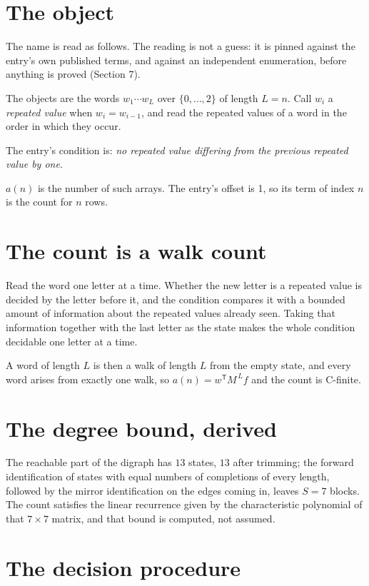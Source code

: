 \documentclass[11pt]{article}
\theoremstyle{definition}
\begin{document}
\section{The object}

The name is read as follows. The reading is not a guess: it is pinned against the entry's own published terms, and against an independent enumeration, before anything is proved (Section 7).

The objects are the words $w_1\cdots w_L$ over $\{0,\dots,2\}$ of length $L = n$. Call $w_i$ a {\itshape repeated value} when $w_i = w_{i-1}$, and read the repeated values of a word in the order in which they occur.

The entry's condition is: {\itshape no repeated value differing from the previous repeated value by one}.

$a(n)$ is the number of such arrays. The entry's offset is 1, so its term of index $n$ is the count for $n$ rows.

\section{The count is a walk count}

Read the word one letter at a time. Whether the new letter is a repeated value is decided by the letter before it, and the condition compares it with a bounded amount of information about the repeated values already seen. Taking that information together with the last letter as the state makes the whole condition decidable one letter at a time.

A word of length $L$ is then a walk of length $L$ from the empty state, and every word arises from exactly one walk, so $a(n) = w^{\mathsf T}M^{\,L}f$ and the count is C-finite.

\section{The degree bound, derived}

The reachable part of the digraph has $13$ states, $13$ after trimming; the forward identification of states with equal numbers of completions of every length, followed by the mirror identification on the edges coming in, leaves $S = 7$ blocks. The count satisfies the linear recurrence given by the characteristic polynomial of that $7\times7$ matrix, and that bound is computed, not assumed.

\section{The decision procedure}
\end{document}
